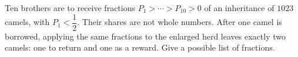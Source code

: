 Ten brothers are to receive fractions $P_1>\cdots>P_{10}>0$ of an inheritance of $1023$ camels, with $P_1<\dfrac{1}{2}$. Their shares are not whole numbers. After one camel is borrowed, applying the same fractions to the enlarged herd leaves exactly two camels: one to return and one as a reward. Give a possible list of fractions.
